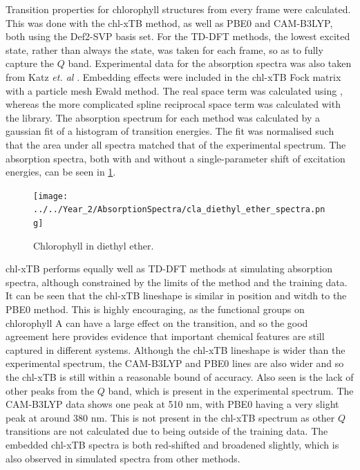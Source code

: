Transition properties for chlorophyll structures from every frame were calculated.
This was done with the chl-xTB method, as well as PBE0 and CAM-B3LYP, both using 
the Def2-SVP basis set. For the TD-DFT methods, the lowest excited state, rather
than always the \Qy state, was taken for each frame, so as to fully capture the 
$Q$ band. Experimental data for the absorption spectra was also taken from Katz 
\emph{et. al} \cite{Strain1963}. Embedding effects were included in the chl-xTB
Fock matrix with a particle mesh Ewald method. The real space term was calculated
using , whereas the more complicated spline reciprocal space term was
calculated with the  library. The absorption spectrum for each method
was calculated by a gaussian fit of a histogram of transition  energies. The fit
was normalised such that the area under all spectra matched that of the experimental 
spectrum. The absorption spectra, both with and without a single-parameter shift
of excitation energies, can be seen in \ref{fig:chl_diethyl_ether}.

\begin{figure}
    \centering
    \texttt{[image: ../../Year\_2/AbsorptionSpectra/cla\_diethyl\_ether\_spectra.png]}
    \caption{Chlorophyll in diethyl ether.}
    \label{fig:chl_diethyl_ether}
\end{figure}

chl-xTB performs equally well as TD-DFT methods at simulating absorption spectra,
although constrained by the limits of the method and the training data.
It can be seen that the chl-xTB lineshape is similar in position and witdh to the
PBE0 method. This is highly encouraging, as the functional groups on chlorophyll A
can have a large effect on the \Qy transition, and so the good agreement here provides
evidence that important chemical features are still captured in different systems.
Although the chl-xTB lineshape is wider than the experimental spectrum, the CAM-B3LYP 
and PBE0 lines are also wider and so the chl-xTB is still within a reasonable bound
of accuracy.
Also seen is the lack of other peaks from the $Q$ band, which is present in the
experimental spectrum. The CAM-B3LYP data shows one peak at 510 nm, with PBE0 having
a very slight peak at around 380 nm. This is not present in the chl-xTB spectrum
as other $Q$ transitions are not calculated due to being outside of the training
data. The embedded chl-xTB spectra is both red-shifted and broadened slightly, which
is also observed in simulated spectra from other methods.

